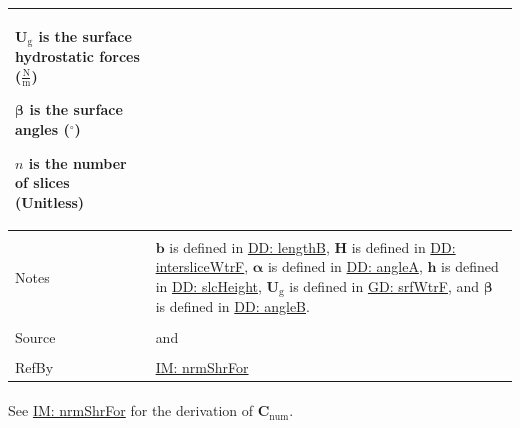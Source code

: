 \documentclass[12pt]{article}
\begin{document}
\begin{minipage}{\textwidth}
\begin{tabular}{>{\raggedright}p{}>{\raggedright\arraybackslash}p{}}
\begin{symbDescription}
              \item{${\mathbf{U}_{\text{g}}}$ is the surface hydrostatic forces ($\frac{\text{N}}{\text{m}}$)}
              \item{$\mathbf{β}$ is the surface angles (${}^{\circ}$)}
              \item{$n$ is the number of slices (Unitless)}
              \end{symbDescription}
\\ \midrule \\
Notes & $\mathbf{b}$ is defined in \hyperref[DD:lengthB]{DD: lengthB}, $\mathbf{H}$ is defined in \hyperref[DD:intersliceWtrF]{DD: intersliceWtrF}, $\mathbf{α}$ is defined in \hyperref[DD:angleA]{DD: angleA}, $\mathbf{h}$ is defined in \hyperref[DD:slcHeight]{DD: slcHeight}, ${\mathbf{U}_{\text{g}}}$ is defined in \hyperref[GD:srfWtrF]{GD: srfWtrF}, and $\mathbf{β}$ is defined in \hyperref[DD:angleB]{DD: angleB}.
        
\\ \midrule \\
Source & \cite{chen2005} and \cite{karchewski2012}
         
\\ \midrule \\
RefBy & \hyperref[IM:nrmShrFor]{IM: nrmShrFor}
        
\\ \bottomrule
\end{tabular}
\end{minipage}
\paragraph{}
\label{IM:nrmShrForNumDeriv}
See \hyperref[IM:nrmShrFor]{IM: nrmShrFor} for the derivation of ${\mathbf{C}_{\text{num}}}$.
\end{document}
